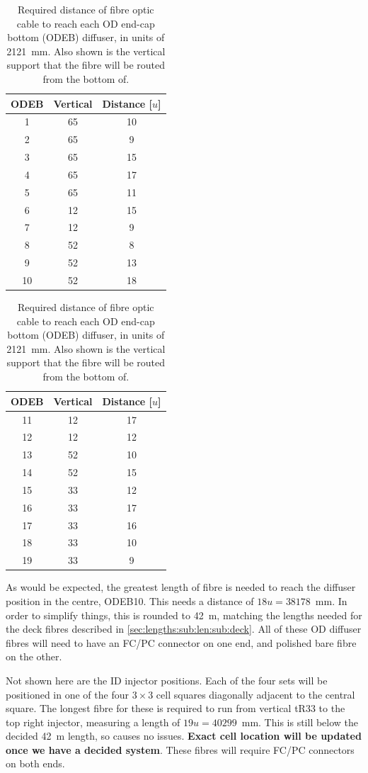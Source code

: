 \documentclass[a4paper,11pt]{article}
\begin{document}
\begin{table}[h!]
\centering
\begin{tabular}[t]{ccc}\toprule
ODEB	&	Vertical	&	Distance [$u$]	\\ \midrule
1		&		65		&	10		\\
2		&		65		&	9		\\
3		&		65		&	15		\\
4		&		65		&	17		\\
5		&		65		&	11		\\
6		&		12		&	15		\\
7		&		12		&	9		\\
8		&		52		&	8		\\
9		&		52		&	13		\\
10		&		52		&	18		\\	\bottomrule
\end{tabular}
\hspace{1cm}
\begin{tabular}[t]{ccc}\toprule
ODEB	&	Vertical	&	Distance [$u$]	\\ \midrule
11		&		12		&	17		\\
12		&		12		&	12		\\
13		&		52		&	10		\\
14		&		52		&	15		\\
15		&		33		&	12		\\
16		&		33		&	17		\\
17		&		33		&	16		\\
18		&		33		&	10		\\
19		&		33		&	9		\\	\bottomrule
\end{tabular}
\caption{Required distance of fibre optic cable to reach each OD end-cap bottom (ODEB) diffuser, in units of 2121~mm. Also shown is the vertical support that the fibre will be routed from the bottom of.}\label{tab:bottomEndCapLen}
\end{table}
As would be expected, the greatest length of fibre is needed to reach the diffuser position in the centre, ODEB10. This needs a distance of $18u = 38178$~mm. In order to simplify things, this is rounded to 42~m, matching the lengths needed for the deck fibres described in \cref{sec:lengths:sub:len:sub:deck}. All of these OD diffuser fibres will need to have an FC/PC connector on one end, and polished bare fibre on the other.

Not shown here are the ID injector positions. Each of the four sets will be positioned in one of the four $3\times 3$ cell squares diagonally adjacent to the central square. The longest fibre for these is required to run from vertical tR33 to the top right injector, measuring a length of $19u=40299$~mm. This is still below the decided 42~m length, so causes no issues. {\bf Exact cell location will be updated once we have a decided system}. These fibres will require FC/PC connectors on both ends.
\end{document}
